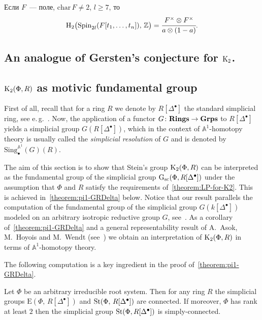 \documentclass[oneside, 11pt]{amsart} \pdfoutput=1
\begin{document}
\begin{corollary}
Если $F$~--- поле, $\mathrm{char}\,F\neq2$, $l\geq7$, то
$$
\mathrm H_2\big(\mathrm{Spin}_{2l}(F[t_1,\ldots,t_n]),\,\mathbb Z\big)=\cfrac{F^\times\otimes F^\times}{a\otimes(1-a)}.
$$
\end{corollary}
\subsection{An analogue of Gersten's conjecture for ${\mathrm{K}}_2$.}

\subsection{\texorpdfstring{${\mathrm{K}}_2(\Phi, R)$}{K2(Ф, R)} as motivic fundamental group}
First of all, recall that for a ring $R$ we denote by $R[\Delta^\bullet]$ the standard simplicial ring, see e.\,g.~\cite{Jar83}. Now, the application of a functor $G\colon{\normalfont\textbf{Rings}}\rightarrow{\normalfont\textbf{Grps}}$ to $R[\Delta^\bullet]$ yields a simplicial group $G(R[\Delta^\bullet])$, which in the context of $\mathbb{A}^1$-homotopy theory is usually called the {\it simplicial resolution} of $G$ and is denoted by $\mathrm{Sing}^{\mathbb{A}^1}_\bullet(G)(R)$.

The aim of this section is to show that Stein's group ${\mathrm{K}}_2(\Phi, R)$ can be interpreted as the fundamental group of the simplicial group $\mathrm{G}_\mathrm{sc}(\Phi, R[\Delta^\bullet])$ under the assumption that $\Phi$ and $R$ satisfy the requirements of~\cref{theorem:LP-for-K2}. This is achieved in~\cref{theorem:pi1-GRDelta} below. Notice that our result parallels the computation of the fundamental group of the simplicial group $G(k[\Delta^\bullet])$ modeled on an arbitrary isotropic reductive group $G$, see~\cite[Proposition~3.2]{VW16}. As a corollary of~\cref{theorem:pi1-GRDelta} and a general representability result of A.~Asok, M.~Hoyois and M.~Wendt (see~\cite[Theorem~4.3.1]{AHW18}) we obtain an interpretation of ${\mathrm{K}}_2(\Phi, R)$ in terms of $\mathbb{A}^1$-homotopy theory.

The following computation is a key ingredient in the proof of~\cref{theorem:pi1-GRDelta}.
\begin{prop}\label{prop:pi1-StDelta} Let $\Phi$ be an arbitrary irreducible root system. Then for any ring $R$ the simplicial groups $\mathrm E(\Phi,\,R[\Delta^\bullet])$ and $\mathop{\mathrm{St}}\nolimits(\Phi,\,R[\Delta^\bullet])$ are connected. If moreover, $\Phi$ has rank at least $2$ then the simplicial group $\mathop{\mathrm{St}}\nolimits(\Phi, R[\Delta^\bullet])$ is simply-connected. \end{prop}
\end{document}
